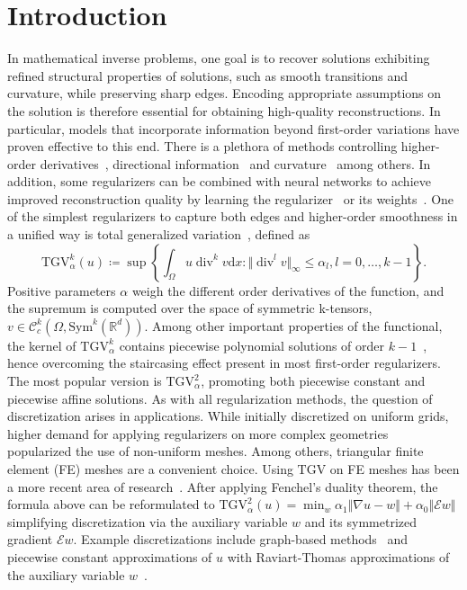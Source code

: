 \documentclass{article}
\DeclareMathOperator{\Div}{div}
\newcommand{\dx}{\mathrm{d}}
\newcommand{\R}{\mathbb{R}}
\newcommand{\TGV}{\mathrm{TGV}}
\begin{document}
	\section{Introduction}
	In mathematical inverse problems, one goal is to recover solutions exhibiting refined structural properties of solutions, such as smooth transitions and curvature, while preserving sharp edges.
	Encoding appropriate assumptions on the solution is therefore essential for obtaining high-quality reconstructions.
	In particular, models that incorporate information beyond first-order variations have proven effective to this end.
	There is a plethora of methods controlling higher-order derivatives~\cite{Ch97, Ch00, Ch10}, directional information~\cite{Ko19, Pa20} and curvature~\cite{Sh03} among others.
	In addition,  some regularizers can be combined with neural networks to achieve improved reconstruction quality by learning the regularizer~\cite{Ha26, Ko20, Pi21} or its weights~\cite{Vu25}.
	One of the simplest regularizers to capture both edges and higher-order smoothness in a unified way is total generalized variation~\cite{Br10}, defined as
	\begin{equation*}
		\TGV_\alpha^k(u) \coloneqq \sup \left \lbrace  \int_\Omega u \Div^kv \dx x \colon\Vert \Div^lv\Vert _\infty \leq \alpha_l, l= 0,\ldots,k-1 \right \rbrace.
	\end{equation*}
	Positive parameters $\alpha$ weigh the different order derivatives of the function, and the supremum is computed over the space of symmetric k-tensors, $v \in \mathcal{C}_c^k(\Omega, \mathrm{Sym}^k(\R^d))$.
	Among other important properties of the functional, the kernel of $\TGV_\alpha^k$ contains piecewise polynomial solutions of order $k-1$~\cite{Br14}, hence overcoming the staircasing effect present in most first-order regularizers.
	The most popular version is $\TGV_\alpha^2$, promoting both piecewise constant and piecewise affine solutions.
	As with all regularization methods, the question of discretization arises in applications.
	While initially discretized on uniform grids, higher demand for applying regularizers on more complex geometries~\cite{Je95, Jo16, Lo06} popularized the use of non-uniform meshes.
	Among others, triangular finite element (FE) meshes are a convenient choice.
	Using $\TGV$ on FE meshes has been a more recent area of research~\cite{Ba23}.
	After applying Fenchel's duality theorem, the formula above can be reformulated to $\TGV_{\alpha}^2 (u)= \min_{w} \alpha_1 \Vert \nabla u - w\Vert +  \alpha_0 \Vert \mathcal{E} w\Vert$
	simplifying discretization via the auxiliary variable $w$ and its symmetrized gradient $\mathcal{E} w$.
	Example discretizations include graph-based methods~\cite{Go18} and piecewise constant approximations of $u$ with Raviart-Thomas approximations of the auxiliary variable $w$~\cite{Ba23}.
	
\end{document}
